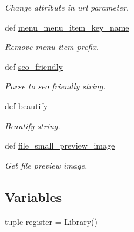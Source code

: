 \begin{DoxyCompactItemize}
\begin{DoxyCompactList}\small\item\em Change attribute in url parameter. \end{DoxyCompactList}\item 
def \hyperlink{namespacecore_1_1templatetags_1_1core__filters_a079fea78e0af4a30471728780861bd0b}{menu\-\_\-menu\-\_\-item\-\_\-key\-\_\-name}
\begin{DoxyCompactList}\small\item\em Remove menu item prefix. \end{DoxyCompactList}\item 
def \hyperlink{namespacecore_1_1templatetags_1_1core__filters_a41bc6bcf9614a358484b9b523bfc11c3}{seo\-\_\-friendly}
\begin{DoxyCompactList}\small\item\em Parse to seo friendly string. \end{DoxyCompactList}\item 
def \hyperlink{namespacecore_1_1templatetags_1_1core__filters_a0cf54202aefae9f23d0d8acd74540d26}{beautify}
\begin{DoxyCompactList}\small\item\em Beautify string. \end{DoxyCompactList}\item 
def \hyperlink{namespacecore_1_1templatetags_1_1core__filters_ac4d907e9554066778277ba05a9a377c0}{file\-\_\-small\-\_\-preview\-\_\-image}
\begin{DoxyCompactList}\small\item\em Get file preview image. \end{DoxyCompactList}\end{DoxyCompactItemize}
\subsection*{Variables}
\begin{DoxyCompactItemize}
\item 
tuple \hyperlink{namespacecore_1_1templatetags_1_1core__filters_a40988169ade55f65ab3f46d488a7252d}{register} = Library()
\end{DoxyCompactItemize}


